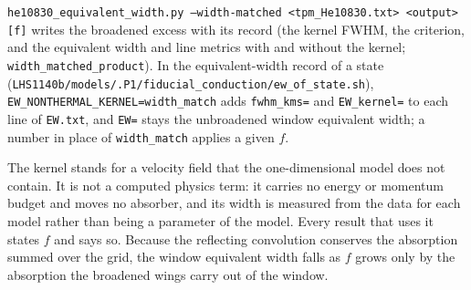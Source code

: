 \texttt{he10830\_equivalent\_width.py --width-matched <tpm\_He10830.txt>
<output> [f]} writes the broadened excess with its record (the kernel FWHM,
the criterion, and the equivalent width and line metrics with and without the
kernel; \texttt{width\_matched\_product}).  In the equivalent-width record of
a state (\texttt{LHS1140b/models/.P1/fiducial\_conduction/ew\_of\_state.sh}),
\texttt{EW\_NONTHERMAL\_KERNEL=width\_match} adds \texttt{fwhm\_kms=} and
\texttt{EW\_kernel=} to each line of \texttt{EW.txt}, and \texttt{EW=} stays
the unbroadened window equivalent width; a number in place of
\texttt{width\_match} applies a given $f$.

The kernel stands for a velocity field that the one-dimensional model does
not contain.  It is not a computed physics term: it carries no energy or
momentum budget and moves no absorber, and its width is measured from the
data for each model rather than being a parameter of the model.  Every result
that uses it states $f$ and says so.  Because the reflecting convolution
conserves the absorption summed over the grid, the window equivalent width
falls as $f$ grows only by the absorption the broadened wings carry out of
the window.
